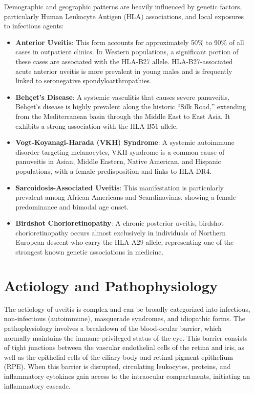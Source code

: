 Demographic and geographic patterns are heavily influenced by genetic factors, particularly Human Leukocyte Antigen (HLA) associations, and local exposures to infectious agents:
\begin{itemize}
    \item \textbf{Anterior Uveitis}: This form accounts for approximately 50\% to 90\% of all cases in outpatient clinics. In Western populations, a significant portion of these cases are associated with the HLA-B27 allele. HLA-B27-associated acute anterior uveitis is more prevalent in young males and is frequently linked to seronegative spondyloarthropathies.
    \item \textbf{Beh\c{c}et's Disease}: A systemic vasculitis that causes severe panuveitis, Beh\c{c}et's disease is highly prevalent along the historic ``Silk Road,'' extending from the Mediterranean basin through the Middle East to East Asia. It exhibits a strong association with the HLA-B51 allele.
    \item \textbf{Vogt-Koyanagi-Harada (VKH) Syndrome}: A systemic autoimmune disorder targeting melanocytes, VKH syndrome is a common cause of panuveitis in Asian, Middle Eastern, Native American, and Hispanic populations, with a female predisposition and links to HLA-DR4.
    \item \textbf{Sarcoidosis-Associated Uveitis}: This manifestation is particularly prevalent among African Americans and Scandinavians, showing a female predominance and bimodal age onset.
    \item \textbf{Birdshot Chorioretinopathy}: A chronic posterior uveitis, birdshot chorioretinopathy occurs almost exclusively in individuals of Northern European descent who carry the HLA-A29 allele, representing one of the strongest known genetic associations in medicine.
\end{itemize}

\section*{Aetiology and Pathophysiology}
The aetiology of uveitis is complex and can be broadly categorized into infectious, non-infectious (autoimmune), masquerade syndromes, and idiopathic forms. The pathophysiology involves a breakdown of the blood-ocular barrier, which normally maintains the immune-privileged status of the eye. This barrier consists of tight junctions between the vascular endothelial cells of the retina and iris, as well as the epithelial cells of the ciliary body and retinal pigment epithelium (RPE). When this barrier is disrupted, circulating leukocytes, proteins, and inflammatory cytokines gain access to the intraocular compartments, initiating an inflammatory cascade.

